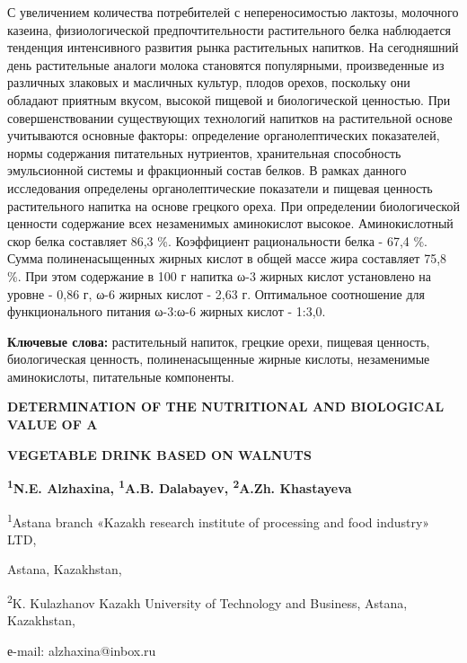 С увеличением количества потребителей с непереносимостью лактозы,
молочного казеина, физиологической предпочтительности растительного
белка наблюдается тенденция интенсивного развития рынка растительных
напитков. На сегодняшний день растительные аналоги молока становятся
популярными, произведенные из различных злаковых и масличных культур,
плодов орехов, поскольку они обладают приятным вкусом, высокой пищевой и
биологической ценностью. При совершенствовании существующих технологий
напитков на растительной основе учитываются основные факторы:
определение органолептических показателей, нормы содержания питательных
нутриентов, хранительная способность эмульсионной системы и фракционный
состав белков. В рамках данного исследования определены
органолептические показатели и пищевая ценность растительного напитка на
основе грецкого ореха. При определении биологической ценности содержание
всех незаменимых аминокислот высокое. Аминокислотный скор белка
составляет 86,3 \%. Коэффициент рациональности белка - 67,4 \%. Сумма
полиненасыщенных жирных кислот в общей массе жира составляет 75,8 \%.
При этом содержание в 100 г напитка ω-3 жирных кислот установлено на
уровне - 0,86 г, ω-6 жирных кислот - 2,63 г. Оптимальное соотношение для
функционального питания ω-3:ω-6 жирных кислот - 1:3,0.

{\bfseries Ключевые слова:} растительный напиток, грецкие орехи, пищевая
ценность, биологическая ценность, полиненасыщенные жирные кислоты,
незаменимые аминокислоты, питательные компоненты.

{\bfseries DETERMINATION OF THE NUTRITIONAL AND BIOLOGICAL VALUE OF A}

{\bfseries VEGETABLE DRINK BASED ON WALNUTS}

{\bfseries \textsuperscript{1}N.E. Alzhaxina, \textsuperscript{1}A.B.
Dalabayev, \textsuperscript{2}A.Zh. Khastayeva}

\textsuperscript{1}Astana branch «Kazakh research institute of
processing and food industry» LTD,

Astana, Kazakhstan,

\textsuperscript{2}K. Kulazhanov Kazakh University of Technology and
Business, Astana, Kazakhstan,

е-mail: alzhaxina@inbox.ru

